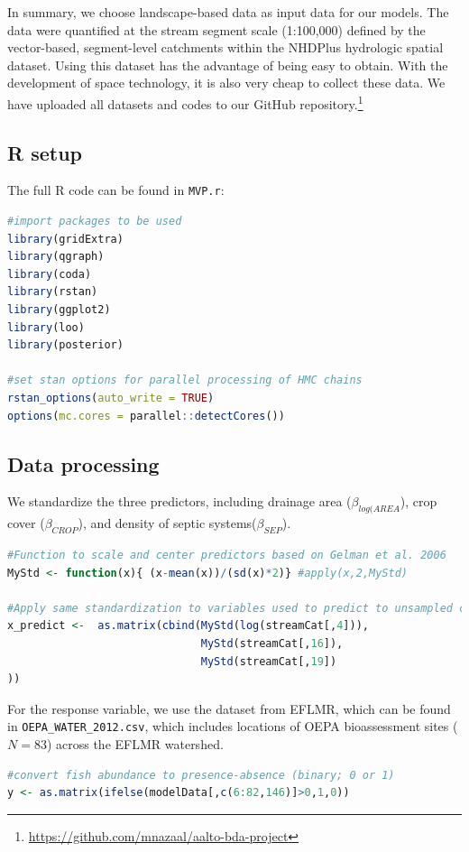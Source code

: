 \documentclass[a4paper]{artikel3}
\begin{document}
In summary, we choose landscape-based data as input data for our models. The data were quantiﬁed at the stream segment scale (1:100,000) deﬁned by the vector-based, segment-level catchments within the NHDPlus hydrologic spatial dataset. Using this dataset has the advantage of being easy to obtain. With the development of space technology, it is also very cheap to collect these data. We have uploaded all datasets and codes to our GitHub repository.\footnote{\url{https://github.com/mnazaal/aalto-bda-project}}

\subsection{R setup}
The full R code can be found in \texttt{MVP.r}:
\begin{lstlisting}[language=R]
#import packages to be used
library(gridExtra)
library(qgraph)
library(coda)
library(rstan)
library(ggplot2)
library(loo)
library(posterior)

#set stan options for parallel processing of HMC chains
rstan_options(auto_write = TRUE)
options(mc.cores = parallel::detectCores())
\end{lstlisting}

\subsection{Data processing}
We standardize the three predictors, including drainage area ($\beta_{log(AREA}$), crop cover ($\beta_{CROP}$), and density of septic systems($\beta_{SEP}$). 
\begin{lstlisting}[language=R]
#Function to scale and center predictors based on Gelman et al. 2006
MyStd <- function(x){ (x-mean(x))/(sd(x)*2)} #apply(x,2,MyStd)

#Apply same standardization to variables used to predict to unsampled catchments
x_predict <-  as.matrix(cbind(MyStd(log(streamCat[,4])),
                              MyStd(streamCat[,16]),
                              MyStd(streamCat[,19])
))
\end{lstlisting}

For the response variable, we use the dataset from EFLMR, which can be found in \texttt{OEPA\_WATER\_2012.csv}, which includes locations of OEPA bioassessment sites ($N=83$) across the EFLMR watershed. 
\begin{lstlisting}[language=R]
#convert fish abundance to presence-absence (binary; 0 or 1)
y <- as.matrix(ifelse(modelData[,c(6:82,146)]>0,1,0))
\end{lstlisting}
\end{document}
